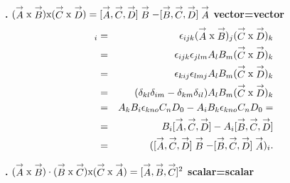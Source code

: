 {\vspace{.1in}
{\bf {}.} $(\stackrel{\rightarrow}{A} \textup{x} \stackrel{\rightarrow}{B})\textup{x} (\stackrel{\rightarrow}{C} \textup{x} \stackrel{\rightarrow}{D})= [\stackrel{\rightarrow}{A} , \stackrel{\rightarrow}{C} , \stackrel{\rightarrow}{D}] \stackrel{\rightarrow}{B} -
[\stackrel{\rightarrow}{B} , \stackrel{\rightarrow}{C} , \stackrel{\rightarrow}{D}] \stackrel{\rightarrow}{A}$
{\flushleft \bf vector=vector}
\begin{eqnarray*}
[(\stackrel{\rightarrow}{A} \textup{x} \stackrel{\rightarrow}{B})\textup{x} (\stackrel{\rightarrow}{C} \textup{x} \stackrel{\rightarrow}{D})]_i&=&
\epsilon_{ijk}(\stackrel{\rightarrow}{A} \textup{x} \stackrel{\rightarrow}{B})_j (\stackrel{\rightarrow}{C} \textup{x} \stackrel{\rightarrow}{D})_k\\
&=&\epsilon_{ijk}\epsilon_{jlm}A_lB_m (\stackrel{\rightarrow}{C} \textup{x} \stackrel{\rightarrow}{D})_k\\
&=&\epsilon_{kij}\epsilon_{lmj}A_lB_m (\stackrel{\rightarrow}{C} \textup{x} \stackrel{\rightarrow}{D})_k\\
&=&(\delta_{kl}\delta_{im}-\delta_{km}\delta_{il})A_lB_m (\stackrel{\rightarrow}{C} \textup{x} \stackrel{\rightarrow}{D})_k \\
&=&A_kB_i\epsilon_{kno}C_nD_0 - A_iB_k\epsilon_{kno}C_nD_0=\\
&=&B_i[\stackrel{\rightarrow}{A} , \stackrel{\rightarrow}{C} , \stackrel{\rightarrow}{D}]-A_i[\stackrel{\rightarrow}{B} , \stackrel{\rightarrow}{C} , \stackrel{\rightarrow}{D}]\\
&=&([\stackrel{\rightarrow}{A} , \stackrel{\rightarrow}{C} , \stackrel{\rightarrow}{D}] \stackrel{\rightarrow}{B} -
[\stackrel{\rightarrow}{B} , \stackrel{\rightarrow}{C} , \stackrel{\rightarrow}{D}] \stackrel{\rightarrow}{A})_i.
\end{eqnarray*}

\vspace{.1in}

{\bf {}.} $(\stackrel{\rightarrow}{A} \textup{x} \stackrel{\rightarrow}{B})\cdot (\stackrel{\rightarrow}{B} \textup{x} \stackrel{\rightarrow}{C}) \textup{x} (\stackrel{\rightarrow}{C} \textup{x} \stackrel{\rightarrow}{A})= [\stackrel{\rightarrow}{A} , \stackrel{\rightarrow}{B} , \stackrel{\rightarrow}{C}] ^2$
{\flushleft \bf scalar=scalar}



}
